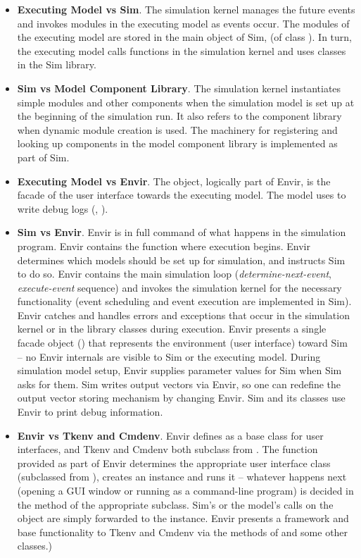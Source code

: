 \begin{itemize}
  \item{\textbf{Executing Model vs Sim}. The simulation kernel
    manages the future events and invokes modules in the executing model
    as events occur. The modules of the executing model are stored
    in the main object of Sim,  (of class ).
    In turn, the executing model calls functions in the
    simulation kernel and uses classes in the Sim library.}
  \item{\textbf{Sim vs Model Component Library}. The simulation kernel
    instantiates simple modules and other components when the simulation model
    is set up at the beginning of the simulation run. It also refers
    to the component library when dynamic module creation is used.
    The machinery for registering and looking up components in the model
    component library is implemented as part of Sim.}
  \item{\textbf{Executing Model vs Envir}. The  object, logically
    part of Envir, is the facade of the user interface towards the executing model.
    The model uses  to write debug logs (, ).}
  \item{\textbf{Sim vs Envir}. Envir is in full command of what
    happens in the simulation program. Envir contains the  function
    where execution begins. Envir determines which models should be set up
    for simulation, and instructs Sim to do so. Envir contains the main
    simulation loop (\textit{determine-next-event}, \textit{execute-event}
    sequence) and invokes the simulation kernel for the necessary
    functionality (event scheduling and event execution are implemented in Sim).
    Envir catches and handles errors and exceptions that occur
    in the simulation kernel or in the library
    classes during execution. Envir presents a single facade object ()
    that represents the environment (user interface) toward Sim -- no Envir
    internals are visible to Sim or the executing model.
    During simulation model setup, Envir supplies parameter values for
    Sim when Sim asks for them. Sim writes output vectors via Envir,
    so one can redefine the output vector storing mechanism by changing Envir.
    Sim and its classes use Envir to print debug information.}
  \item{\textbf{Envir vs Tkenv and Cmdenv}. Envir defines 
    as a base class for user interfaces, and Tkenv and Cmdenv both subclass
    from . The  function provided as part of Envir
    determines the appropriate user interface class (subclassed from
    ), creates an instance and runs it -- whatever
    happens next (opening a GUI window or running as a command-line program)
    is decided in the  method of the appropriate 
    subclass. Sim's or the model's calls on the  object are
    simply forwarded to the  instance. Envir presents
    a framework and base functionality to Tkenv and Cmdenv via the methods of
      and some other classes.)}
\end{itemize}


